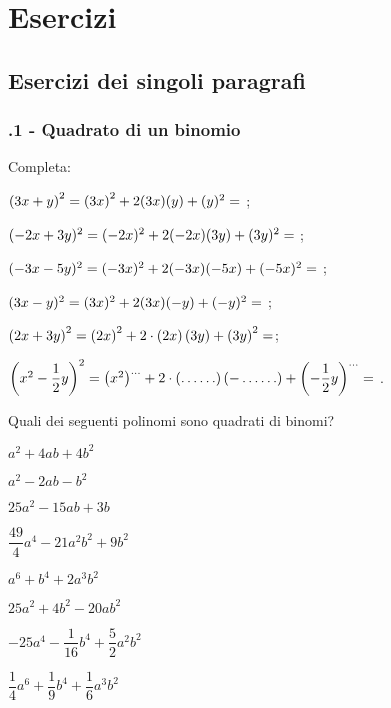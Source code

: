 \section{Esercizi}
\subsection{Esercizi dei singoli paragrafi}
\subsubsection*{\thechapter.1 - Quadrato di un binomio}
\begin{esercizio}
 \label{ese:11.1}
Completa:

\begin{enumeratea}
\item $ \left( 3x + y\right)^{2} = \left(3x\right)^{2} + 2(3x)(y) + (y) ^{2} = \dotfill~$;
\item $ (-2x + 3y)^{2} = (-2x)^{2} + 2(-2x)(3y) +(3y)^{2} = \dotfill~$;
\item $(-3x -5y)^{2} = (-3x)^{2} + 2(-3x)(-5x)+(-5x)^{2}= \dotfill~$;
\item $(3x - y)^{2} = (3x)^{2} +2(3x)(-y) + (-y)^{2} = \dotfill~$;
\item $\left(2x+3y\right)^{2}=\left(2x\right)^{2}+2\cdot\left(2x\right)\left(3y\right)+\left(3y\right)^{2}=\dotfill$;
\item $\left(x^{2}-\dfrac{1}{2}y\right)^{2}=\left(x^{2}\right)^{\ldots}+2\cdot%
\left(\ldots \ldots \right)\left(-\ldots \ldots%
\right)+\left(-{\dfrac{1}{2}}y\right)^{\ldots }=\dotfill~$.
\end{enumeratea}
\end{esercizio}


\begin{esercizio}
 \label{ese:11.2}
Quali dei seguenti polinomi sono quadrati di binomi?

\begin{multicols}{2}
\TabPositions{4cm}
\begin{enumeratea}
\spazielenx
\item $a^{2}+4{ab}+4b^{2}$ \tab\boxSi\quad\boxNo
\item $a^{2}-2{ab}-b^{2}$ \tab\boxSi\quad\boxNo
\item $25a^{2}-15{ab}+3b$ \tab\boxSi\quad\boxNo
\item $\dfrac{49}{4}a^{4}-21a^{2}b^{2}+9b^{2}$ \tab\boxSi\quad\boxNo
\item $a^{6}+b^{4}+2a^{3}b^{2}$ \tab\boxSi\quad\boxNo
\item $25a^{2}+4b^{2}-20{ab}^{2}$ \tab\boxSi\quad\boxNo
\item $-25a^{4}-\dfrac{1}{16}b^{4}+\dfrac{5}{2}a^{2}b^{2}$ \tab\boxSi\quad\boxNo
\item $\dfrac{1}{4}a^{6}+\dfrac{1}{9}b^{4}+\dfrac{1}{6}a^{3}b^{2}$ \tab\boxSi\quad\boxNo
\end{enumeratea}
\end{multicols}
\end{esercizio}

